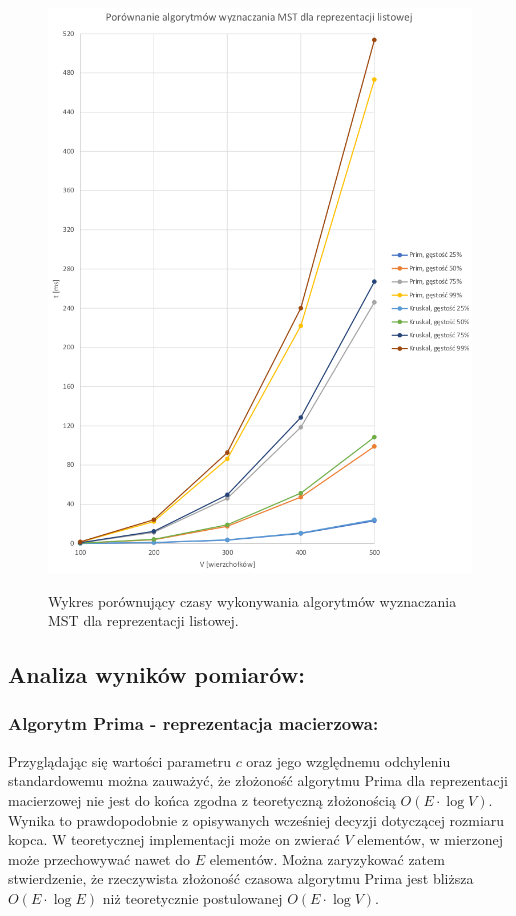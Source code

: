 \documentclass[a4paper,12pt]{article}
\begin{document}
\begin{figure}[H]
	\centering
	\caption{\centering Wykres porównujący czasy wykonywania algorytmów wyznaczania MST dla reprezentacji listowej.}
	\includegraphics[width=14cm]{fig6.png}
	\label{fig.wykres-lista-mst}
\end{figure}

\subsection{Analiza wyników pomiarów:}

\subsubsection{Algorytm Prima - reprezentacja macierzowa:}
Przyglądając się wartości parametru $c$ oraz jego względnemu odchyleniu standardowemu można zauważyć, że złożoność algorytmu Prima dla reprezentacji macierzowej nie jest do końca zgodna z teoretyczną złożonością $O(E \cdot \log V)$. Wynika to prawdopodobnie z opisywanych wcześniej decyzji dotyczącej rozmiaru kopca. W teoretycznej implementacji może on zwierać $V$ elementów, w mierzonej może przechowywać nawet do $E$ elementów. Można zaryzykować zatem stwierdzenie, że rzeczywista złożoność czasowa algorytmu Prima jest bliższa $O(E \cdot \log E)$ niż teoretycznie postulowanej $O(E \cdot \log V)$.\\
\end{document}
